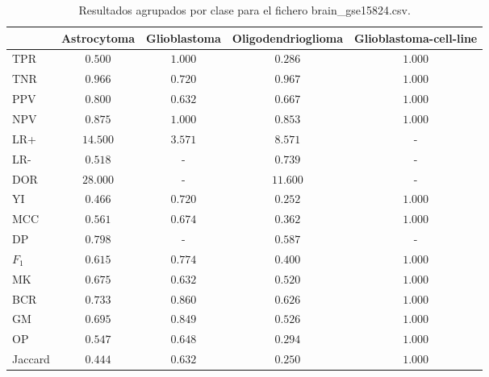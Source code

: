 \begin{table}[htp]
    \small
    \centering
    \begin{tabularx}{\columnwidth}{l c c c c}
                &  Astrocytoma  & Glioblastoma & Oligodendrioglioma   & Glioblastoma-cell-line   \\\hline
        TPR     &  $0.500$      & $1.000$      & $0.286$              & $1.000$                  \\\hline
        TNR     &  $0.966$      & $0.720$      & $0.967$              & $1.000$                  \\\hline
        PPV     &  $0.800$      & $0.632$      & $0.667$              & $1.000$                  \\\hline
        NPV     &  $0.875$      & $1.000$      & $0.853$              & $1.000$                  \\\hline
        LR+     &  $14.500$     & $3.571$      & $8.571$              & -                        \\\hline
        LR-     &  $0.518$      & -            & $0.739$              & -                        \\\hline
        DOR     &  $28.000$     & -            & $11.600$             & -                        \\\hline
        YI      &  $0.466$      & $0.720$      & $0.252$              & $1.000$                  \\\hline
        MCC     &  $0.561$      & $0.674$      & $0.362$              & $1.000$                  \\\hline
        DP      &  $0.798$      & -            & $0.587$              & -                        \\\hline
        $F_{1}$ &  $0.615$      & $0.774$      & $0.400$              & $1.000$                  \\\hline
        MK      &  $0.675$      & $0.632$      & $0.520$              & $1.000$                  \\\hline
        BCR     &  $0.733$      & $0.860$      & $0.626$              & $1.000$                  \\\hline
        GM      &  $0.695$      & $0.849$      & $0.526$              & $1.000$                  \\\hline
        OP      &  $0.547$      & $0.648$      & $0.294$              & $1.000$                  \\\hline
        Jaccard &  $0.444$      & $0.632$      & $0.250$              & $1.000$                  \\\hline

    \end{tabularx}
    \caption{Resultados agrupados por clase para el fichero brain\_gse15824.csv.}
    \label{tab:6}
\end{table}


